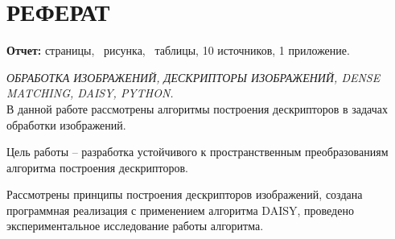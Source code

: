 
\def\l@subsection{\@dottedtocline{2}{3.8em}{3.2em}}
\setcounter{tocdepth}{2}



\newcommand{\incpic}[3]{
	\begin{figure}[H] 
		\begin{center} 
			\texttt{[image: \#1]} 
			\caption{#2}
			\label{#3} 
		\end{center}
	\end{figure} 
}




\setcounter{page}{3}
\setcounter{secnumdepth}{3}

\section*{РЕФЕРАТ}
{
	{\bf Отчет:}
	\pageref{LastPage} страницы,
	\totalfigures\ рисунка,
	\totaltables\ таблицы,
	10 источников,
	1 приложение.
	
	
	\textit{ОБРАБОТКА ИЗОБРАЖЕНИЙ, ДЕСКРИПТОРЫ ИЗОБРАЖЕНИЙ, DENSE MATCHING, DAISY, PYTHON.}\\
	
	В данной работе рассмотрены алгоритмы построения дескрипторов в задачах обработки изображений.
	
	Цель работы -- разработка устойчивого к пространственным преобразованиям алгоритма построения дескрипторов.
	
	Рассмотрены принципы построения дескрипторов изображений, создана программная реализация с применением алгоритма DAISY, проведено экспериментальное исследование работы алгоритма.
}
\newpage

\newpage
\tableofcontents


\newpage
{}
{}

